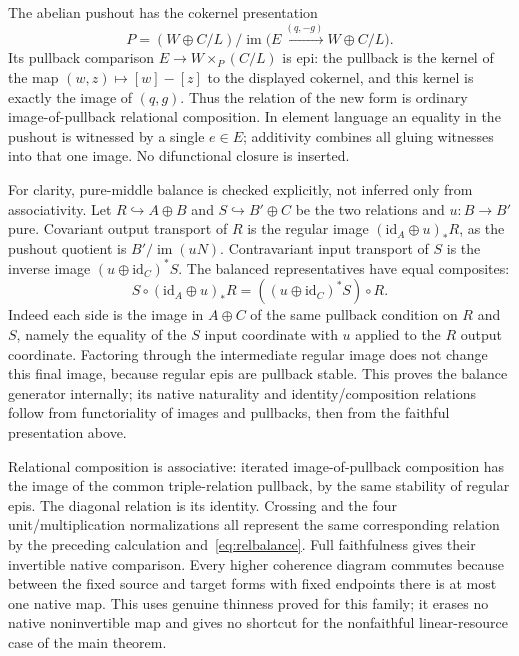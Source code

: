 \documentclass[11pt,a4paper]{article}
\theoremstyle{definition}
\newcommand{\id}{\mathrm{id}}
\newcommand{\im}{\operatorname{im}}
\begin{document}
The abelian pushout has the cokernel presentation
\[
 P=(W\oplus C/L)/\im\bigl(E\xrightarrow{(q,-g)}W\oplus C/L\bigr).
\]
Its pullback comparison $E\to W\times_P(C/L)$ is epi: the pullback is the
kernel of the map $(w,z)\mapsto[w]-[z]$ to the displayed cokernel, and this
kernel is exactly the image of $(q,g)$. Thus the relation of the new form is
ordinary image-of-pullback relational composition. In element language an
equality in the pushout is witnessed by a single $e\in E$; additivity combines
all gluing witnesses into that one image. No difunctional closure is inserted.

For clarity, pure-middle balance is checked explicitly, not inferred only
from associativity. Let $R\hookrightarrow A\oplus B$ and
$S\hookrightarrow B'\oplus C$ be the two relations and $u:B\to B'$ pure.
Covariant output transport of $R$ is the regular image
$(\id_A\oplus u)_*R$, as the pushout quotient is $B'/\im(uN)$.
Contravariant input transport of $S$ is the inverse image
$(u\oplus\id_C)^*S$. The balanced representatives have equal composites:
\begin{equation}\label{eq:relbalance}
 S\circ(\id_A\oplus u)_*R
 =((u\oplus\id_C)^*S)\circ R.
\end{equation}
Indeed each side is the image in $A\oplus C$ of the same pullback condition
on $R$ and $S$, namely the equality of the $S$ input coordinate with $u$
applied to the $R$ output coordinate. Factoring through the intermediate
regular image does not change this final image, because regular epis are
pullback stable. This proves the balance generator internally; its native
naturality and identity/composition relations follow from functoriality of
images and pullbacks, then from the faithful presentation above.

Relational composition is associative: iterated image-of-pullback composition
has the image of the common triple-relation pullback, by the same stability of
regular epis. The diagonal relation is its identity. Crossing and the four
unit/multiplication normalizations all represent the same corresponding
relation by the preceding calculation and~\eqref{eq:relbalance}. Full
faithfulness gives their invertible native comparison. Every higher coherence
diagram commutes because between the fixed source and target forms with fixed
endpoints there is at most one native map. This uses genuine thinness proved
for this family; it erases no native noninvertible map and gives no shortcut
for the nonfaithful linear-resource case of the main theorem.
\end{document}
